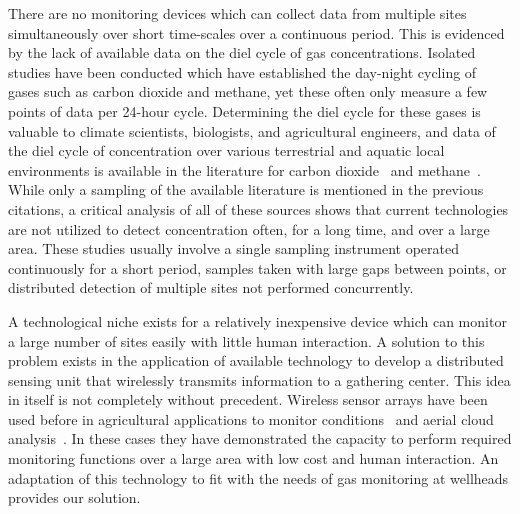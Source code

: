 \documentclass[journal]{IEEEtran}
\begin{document}
There are no monitoring devices which can collect data from multiple sites simultaneously over short time-scales over a continuous period.  This is evidenced by the lack of available data on the diel cycle of gas concentrations.  Isolated studies have been conducted which have established the day-night cycling of gases such as carbon dioxide and methane, yet these often only measure a few points of data per 24-hour cycle.  Determining the diel cycle for these gases is valuable to climate scientists, biologists, and agricultural engineers, and data of the diel cycle of concentration over various terrestrial and aquatic local environments is available in the literature for carbon dioxide~\cite{raymond_carbon_1997,goulden_diel_2004,raich_comparison_1990,osozawa_diel_1995,ni_sestructures_2000,maberly_diel_1996} and methane~\cite{ding_diel_2004,kaki_diel_2001,zhang_diel_2011,wang_effect_1997,wang_factors_1999,van_der_nat_diel_1998}.  While only a sampling of the available literature is mentioned in the previous citations, a critical analysis of all of these sources shows that current technologies are not utilized to detect concentration often, for a long time, and over a large area.  These studies usually involve a single sampling instrument operated continuously for a short period, samples taken with large gaps between points, or distributed detection of multiple sites not performed concurrently.  


A technological niche exists for a relatively inexpensive device which can monitor a large number of sites easily with little human interaction.  A solution to this problem exists in the application of available technology to develop a distributed sensing unit that wirelessly transmits information to a gathering center.  This idea in itself is not completely without precedent.  Wireless sensor arrays have been used before in agricultural applications to monitor conditions~\cite{garcia-sanchez_wireless_2011} and aerial cloud analysis~\cite{allred_sensorflock:_2007}.  In these cases they have demonstrated the capacity to perform required monitoring functions over a large area with low cost and human interaction.  An adaptation of this technology to fit with the needs of gas monitoring at wellheads provides our solution.
\end{document}

